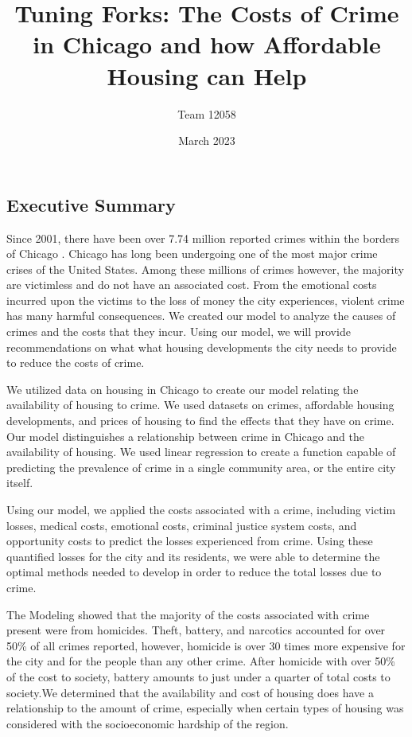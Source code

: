 \documentclass{article}
\title{Tuning Forks: The Costs of Crime in Chicago and how Affordable Housing can Help}
\author{Team 12058}
\date{March 2023}
\begin{document}
\maketitle
\thispagestyle{empty}
\pagestyle{fancy}
\fancyhead{}
\fancyfoot{}

\pagebreak

\tableofcontents

\pagebreak

\setcounter{page}{1}

\begin{onehalfspacing}

\section{Executive Summary}
Since 2001, there have been over 7.74 million reported crimes within the borders of Chicago \cite{crimes}. Chicago has long been undergoing one of the most major crime crises of the United States. Among these millions of crimes however, the majority are victimless and do not have an associated cost. From the emotional costs incurred upon the victims to the loss of money the city experiences, violent crime has many harmful consequences. We created our model to analyze the causes of crimes and the costs that they incur. Using our model, we will provide recommendations on what what housing developments the city needs to provide to reduce the costs of crime.

We utilized data on housing in Chicago to create our model relating the availability of housing to crime. We used datasets on crimes, affordable housing developments, and prices of housing to find the effects that they have on crime.
Our model distinguishes a relationship between crime in Chicago and the availability of housing. We used linear regression to create a function capable of predicting the prevalence of crime in a single community area, or the entire city itself.

Using our model, we applied the costs associated with a crime, including victim losses, medical costs, emotional costs, criminal justice system costs, and opportunity costs to predict the losses experienced from crime. Using these quantified losses for the city and its residents, we were able to determine the optimal methods needed to develop in order to reduce the total losses due to crime.

The Modeling showed that the majority of the costs associated with crime present were from homicides. Theft, battery, and narcotics accounted for over 50\% of all crimes reported, however, homicide is over 30 times more expensive for the city and for the people than any other crime. After homicide with over 50\% of the cost to society, battery amounts to just under a quarter of total costs to society.We determined that the availability and cost of housing does have a relationship to the amount of crime, especially when certain types of housing was considered with the socioeconomic hardship of the region.


\end{onehalfspacing}
\end{document}
